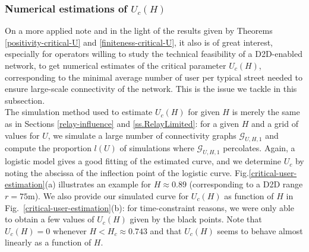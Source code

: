 \documentclass[conference]{IEEEtran}
\begin{document}
\subsubsection{Numerical estimations of $U_c(H)$}
On a more applied note and in the light of the results given by Theorems \ref{positivity-critical-U} and \ref{finiteness-critical-U}, it also is of great interest, especially for operators willing to study the technical feasibility of a D2D-enabled network, to get numerical estimates of the critical parameter $U_c(H)$, corresponding to the minimal average number of user per typical street needed to ensure large-scale connectivity of the network. This is the issue we tackle in this subsection. \\
\indent The simulation method used to estimate $U_{c}(H)$ for given $H$ is merely the same as in Sections \ref{relay-influence} and \ref{ss.RelayLimited}: for a given $H$ and a grid of values for $U$, we simulate a large number of connectivity graphs $\mathcal{G}_{U,H,1}$ and compute the proportion $l(U)$ of simulations where $\mathcal{G}_{U,H,1}$ percolates. Again, a logistic model gives a good fitting of the estimated curve, and we determine $U_{c}$ by noting the abscissa of the inflection point of the logistic curve. Fig.\ref{critical-user-estimation}(a) illustrates an example for $H \approx 0.89$ (corresponding to a D2D range $r = 75 \text{m}$). We also provide our simulated curve for $U_c(H)$ as function of $H$ in Fig.~\ref{critical-user-estimation}(b): for time-constraint reasons, we were only able to obtain a few values of $U_c(H)$ given by the black points. Note that $U_c(H) = 0$ whenever $H < H_c \approx 0.743$ and that $U_c(H)$ seems to behave almost linearly as a function of $H$.
\end{document}
